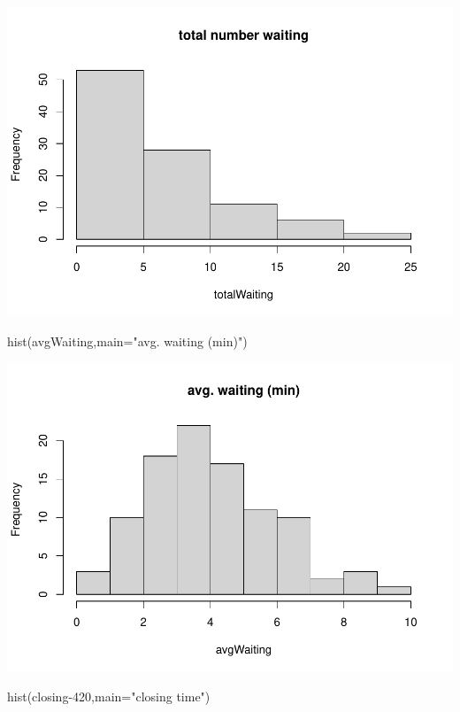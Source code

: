 \documentclass[
]{book}
\newenvironment{Shaded}{\begin{snugshade}}{\end{snugshade}}
\newcommand{\AttributeTok}[1]{\textcolor[rgb]{0.77,0.63,0.00}{#1}}
\newcommand{\DecValTok}[1]{\textcolor[rgb]{0.00,0.00,0.81}{#1}}
\newcommand{\FunctionTok}[1]{\textcolor[rgb]{0.00,0.00,0.00}{#1}}
\newcommand{\NormalTok}[1]{#1}
\newcommand{\StringTok}[1]{\textcolor[rgb]{0.31,0.60,0.02}{#1}}
\theoremstyle{definition}
\theoremstyle{definition}
\theoremstyle{definition}
\theoremstyle{definition}
\theoremstyle{remark}
\begin{document}
\includegraphics{_main_files/figure-latex/simul-2.pdf}

\begin{Shaded}
\begin{Highlighting}[]
 \FunctionTok{hist}\NormalTok{(avgWaiting,}\AttributeTok{main=}\StringTok{"avg. waiting (min)"}\NormalTok{)}
\end{Highlighting}
\end{Shaded}

\includegraphics{_main_files/figure-latex/simul-3.pdf}

\begin{Shaded}
\begin{Highlighting}[]
 \FunctionTok{hist}\NormalTok{(closing}\DecValTok{{-}420}\NormalTok{,}\AttributeTok{main=}\StringTok{"closing time"}\NormalTok{)}
\end{Highlighting}
\end{Shaded}
\end{document}
